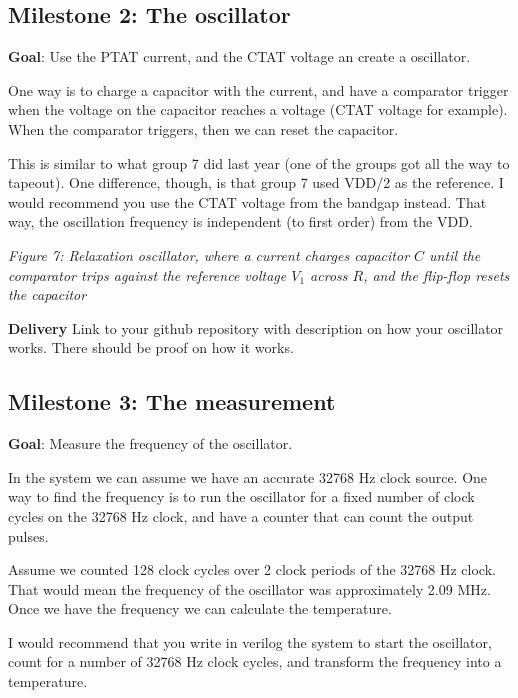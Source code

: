 \subsection{Milestone 2: The
oscillator}\label{milestone-2-the-oscillator}

\textbf{Goal}: Use the PTAT current, and the CTAT voltage an create a
oscillator.

One way is to charge a capacitor with the current, and have a comparator
trigger when the voltage on the capacitor reaches a voltage (CTAT
voltage for example). When the comparator triggers, then we can reset
the capacitor.

This is similar to what group 7 did last year (one of the groups got all
the way to tapeout). One difference, though, is that group 7 used VDD/2
as the reference. I would recommend you use the CTAT voltage from the
bandgap instead. That way, the oscillation frequency is independent (to
first order) from the VDD.


{
\centering
{}
}

\emph{Figure 7: Relaxation oscillator, where a current charges capacitor
\(C\) until the comparator trips against the reference voltage \(V_1\)
across \(R\), and the flip-flop resets the capacitor}

\textbf{Delivery} Link to your github repository with description on how
your oscillator works. There should be proof on how it works.

\subsection{Milestone 3: The
measurement}\label{milestone-3-the-measurement}

\textbf{Goal}: Measure the frequency of the oscillator.

In the system we can assume we have an accurate 32768 Hz clock source.
One way to find the frequency is to run the oscillator for a fixed
number of clock cycles on the 32768 Hz clock, and have a counter that
can count the output pulses.

Assume we counted 128 clock cycles over 2 clock periods of the 32768 Hz
clock. That would mean the frequency of the oscillator was approximately
2.09 MHz. Once we have the frequency we can calculate the temperature.

I would recommend that you write in verilog the system to start the
oscillator, count for a number of 32768 Hz clock cycles, and transform
the frequency into a temperature.


